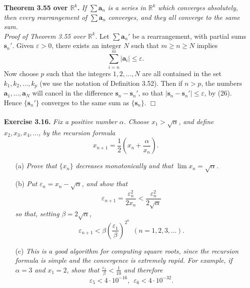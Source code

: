 \documentclass{article}
\begin{document}
\textbf{Theorem 3.55 over $\mathbb{R}^k$.}
\emph{If $\sum \mathbf{a}_n$ is a series in $\mathbb{R}^k$ which converges absolutely,
then every rearrangement of $\sum \mathbf{a}_n$ converges,
and they all converge to the same sum.} \\

\emph{Proof of Theorem 3.55 over $\mathbb{R}^k$.}
Let $\sum \mathbf{a}_n'$ be a rearrangement, with partial sums $\mathbf{s}_n'$.
Given $\varepsilon > 0$, there exists an integer $N$ such that $m \geq n \geq N$ implies
\[
  \sum_{i=n}^{m} |\mathbf{a}_i| \leq \varepsilon \tag{26}.
\]
Now choose $p$ such that the integers $1,2,\ldots,N$ are all contained in the set
$k_1, k_2, \ldots, k_p$ (we use the notation of Definition 3.52).
Then if $n > p$, the numbers $\mathbf{a}_1, \ldots, \mathbf{a}_N$
will cancel in the difference $\mathbf{s}_n - \mathbf{s}_n'$,
so that $|\mathbf{s}_n - \mathbf{s}_n'| \leq \varepsilon$, by (26).
Hence $\{ \mathbf{s}_n' \}$ converges to the same sum as $\{ \mathbf{s}_n \}$.
$\Box$ \\\\






\textbf{Exercise 3.16.}
\emph{Fix a positive number $\alpha$.
Choose $x_1 > \sqrt{\alpha}$, and define $x_2, x_3, x_4, \ldots$,
by the recursion formula
$$x_{n+1} = \frac{1}{2}\left( x_n + \frac{\alpha}{x_n} \right).$$}
\begin{enumerate}
\item[(a)]
\emph{Prove that $\{x_n\}$ decreases monotonically and that
$\lim x_n = \sqrt{\alpha}$.}
\item[(b)]
\emph{Put $\varepsilon_n = x_n - \sqrt{\alpha}$, and show that
$$\varepsilon_{n+1}
= \frac{\varepsilon_n^2}{2 x_n}
< \frac{\varepsilon_n^2}{2 \sqrt{\alpha}}$$
so that, setting $\beta = 2 \sqrt{\alpha}$,
$$\varepsilon_{n+1}
< \beta \left( \frac{\varepsilon_1}{\beta} \right)^{2^n} \:\: (n =1,2,3,\ldots).$$}
\item[(c)]
\emph{This is a good algorithm for computing square roots,
since the recursion formula is simple and the convergence is extremely rapid.
For example, if $\alpha = 3$ and $x_1 = 2$, show that
$\frac{\varepsilon_1}{\beta} < \frac{1}{10}$ and therefore
$$\varepsilon_5 < 4 \cdot 10^{-16}, \:\:
\varepsilon_6 < 4 \cdot 10^{-32}.$$} \\
\end{enumerate}
\end{document}

